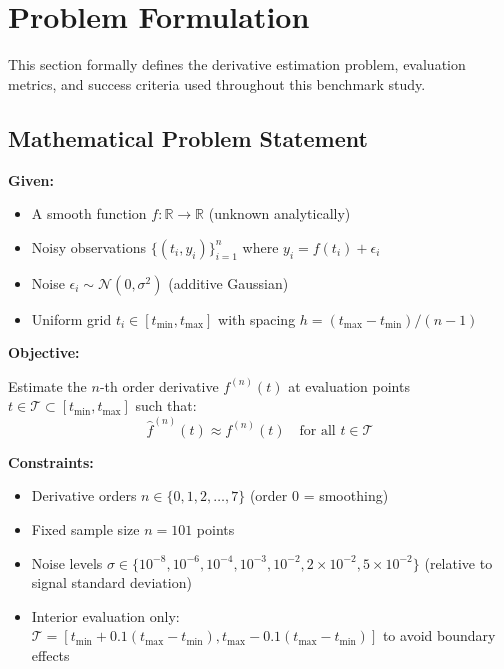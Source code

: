 \section{Problem Formulation}
\label{sec:problem}

This section formally defines the derivative estimation problem, evaluation metrics, and success criteria used throughout this benchmark study.

\subsection{Mathematical Problem Statement}
\label{sec:math_problem}

\textbf{Given:}
\begin{itemize}
    \item A smooth function $f: \mathbb{R} \to \mathbb{R}$ (unknown analytically)
    \item Noisy observations $\{(t_i, y_i)\}_{i=1}^n$ where $y_i = f(t_i) + \epsilon_i$
    \item Noise $\epsilon_i \sim \mathcal{N}(0, \sigma^2)$ (additive Gaussian)
    \item Uniform grid $t_i \in [t_{\text{min}}, t_{\text{max}}]$ with spacing $h = (t_{\text{max}} - t_{\text{min}})/(n-1)$
\end{itemize}

\textbf{Objective:}

Estimate the $n$-th order derivative $f^{(n)}(t)$ at evaluation points $t \in \mathcal{T} \subset [t_{\text{min}}, t_{\text{max}}]$ such that:
\begin{equation}
\hat{f}^{(n)}(t) \approx f^{(n)}(t) \quad \text{for all } t \in \mathcal{T}
\end{equation}

\textbf{Constraints:}
\begin{itemize}
    \item Derivative orders $n \in \{0, 1, 2, \ldots, 7\}$ (order 0 = smoothing)
    \item Fixed sample size $n = 101$ points
    \item Noise levels $\sigma \in \{10^{-8}, 10^{-6}, 10^{-4}, 10^{-3}, 10^{-2}, 2 \times 10^{-2}, 5 \times 10^{-2}\}$ (relative to signal standard deviation)
    \item Interior evaluation only: $\mathcal{T} = [t_{\text{min}} + 0.1(t_{\text{max}} - t_{\text{min}}), t_{\text{max}} - 0.1(t_{\text{max}} - t_{\text{min}})]$ to avoid boundary effects
\end{itemize}

